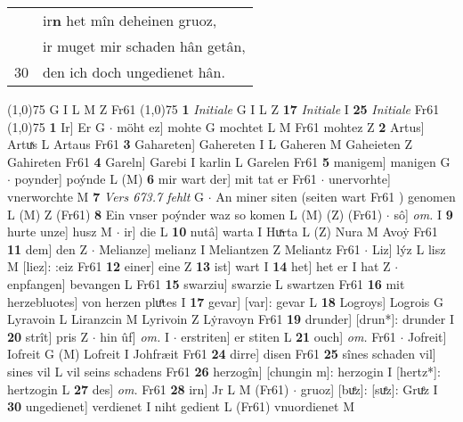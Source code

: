 \documentclass[8pt,a4paper,notitlepage]{article}
\begin{document}
\begin{table}[ht]
\begin{minipage}[t]{0.5\linewidth}
\begin{tabular}{rl}
 & ir\textbf{n} het mîn deheinen gruoz,\\ 
 & ir muget mir schaden hân getân,\\ 
30 & den ich doch ungedienet hân.\\ 
\end{tabular}
\scriptsize
\line(1,0){75} \newline
G I L M Z Fr61 \newline
\line(1,0){75} \newline
\textbf{1} \textit{Initiale} G I L Z  \textbf{17} \textit{Initiale} I  \textbf{25} \textit{Initiale} Fr61  \newline
\line(1,0){75} \newline
\textbf{1} Ir] Er G  $\cdot$ möht ez] mohte G mochtet L M Fr61 mohtez Z \textbf{2} Artus] Artuͯs L Artaus Fr61 \textbf{3} Gahareten] Gahereten I L Gaheren M Gaheieten Z Gahireten Fr61 \textbf{4} Gareln] Garebi I karlin L Garelen Fr61 \textbf{5} manigem] manigen G  $\cdot$ poynder] poýnde L (M) \textbf{6} mir wart der] mit tat er Fr61  $\cdot$ unervorhte] vnerworchte M \textbf{7} \textit{Vers 673.7 fehlt} G   $\cdot$ An miner siten (seiten wart Fr61 ) genomen L (M) Z (Fr61) \textbf{8} Ein vnser poýnder waz so komen L (M) (Z) (Fr61)  $\cdot$ sô] \textit{om.} I \textbf{9} hurte unze] husz M  $\cdot$ ir] die L \textbf{10} nutâ] warta I Huͯrta L (Z) Nura M Avoẏ Fr61 \textbf{11} dem] den Z  $\cdot$ Melianze] melianz I Meliantzen Z Meliantz Fr61  $\cdot$ Liz] lýz L lisz M [liez]: :eiz Fr61 \textbf{12} einer] eine Z \textbf{13} ist] wart I \textbf{14} het] het er I hat Z  $\cdot$ enpfangen] bevangen L Fr61 \textbf{15} swarziu] swarzie L swartzen Fr61 \textbf{16} mit herzebluotes] von herzen pluͦtes I \textbf{17} gevar] [var]: gevar L \textbf{18} Logroys] Logrois G Lyravoin L Liranzcin M Lyrivoin Z Lẏravoyn Fr61 \textbf{19} drunder] [drun*]: drunder I \textbf{20} strît] pris Z  $\cdot$ hin ûf] \textit{om.} I  $\cdot$ erstriten] er stiten L \textbf{21} ouch] \textit{om.} Fr61  $\cdot$ Jofreit] Iofreit G (M) Lofreit I Johfræit Fr61 \textbf{24} dirre] disen Fr61 \textbf{25} sînes schaden vil] sines vil L vil seins schadens Fr61 \textbf{26} herzogîn] [chungin m]: herzogin I [hertz*]: hertzogin L \textbf{27} des] \textit{om.} Fr61 \textbf{28} irn] Jr L M (Fr61)  $\cdot$ gruoz] [buͤz]: [suͤz]: Gruͤz I \textbf{30} ungedienet] verdienet I niht gedient L (Fr61) vnuordienet M \newline
\end{minipage}
\hspace{0.5cm}
\begin{minipage}[t]{0.5\linewidth}

\end{minipage}
\end{table}
\end{document}
